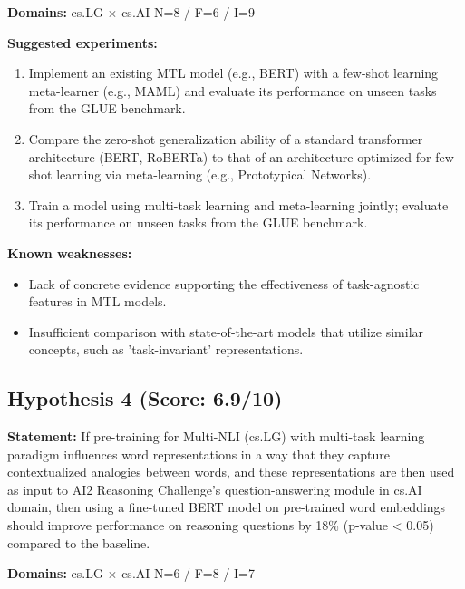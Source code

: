 \documentclass[12pt,a4paper]{article}
\begin{document}
\noindent\textbf{Domains:} cs.LG $\times$ cs.AI
\hspace{1em} N=8 / F=6 / I=9

\textbf{Suggested experiments:}
\begin{enumerate}
  \item Implement an existing MTL model (e.g., BERT) with a few-shot learning meta-learner (e.g., MAML) and evaluate its performance on unseen tasks from the GLUE benchmark.
  \item Compare the zero-shot generalization ability of a standard transformer architecture (BERT, RoBERTa) to that of an architecture optimized for few-shot learning via meta-learning (e.g., Prototypical Networks).
  \item Train a model using multi-task learning and meta-learning jointly; evaluate its performance on unseen tasks from the GLUE benchmark.
\end{enumerate}

\textbf{Known weaknesses:}
\begin{itemize}
  \item Lack of concrete evidence supporting the effectiveness of task-agnostic features in MTL models.
  \item Insufficient comparison with state-of-the-art models that utilize similar concepts, such as 'task-invariant' representations.
\end{itemize}
\subsection*{Hypothesis 4 (Score: 6.9/10)}

\textbf{Statement:} If pre-training for Multi-NLI (cs.LG) with multi-task learning paradigm influences word representations in a way that they capture contextualized analogies between words, and these representations are then used as input to AI2 Reasoning Challenge's question-answering module in cs.AI domain, then using a fine-tuned BERT model on pre-trained word embeddings should improve performance on reasoning questions by 18\% (p-value < 0.05) compared to the baseline.

\noindent\textbf{Domains:} cs.LG $\times$ cs.AI
\hspace{1em} N=6 / F=8 / I=7
\end{document}
